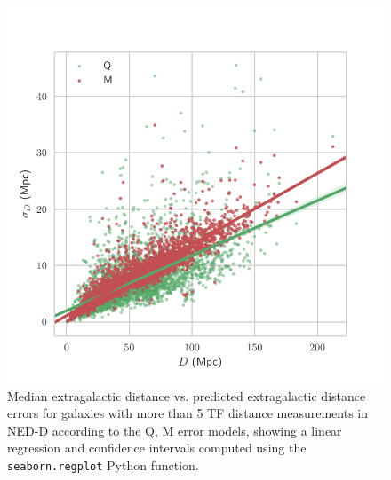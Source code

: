 \documentclass[a4paper,fleqn,usenatbib]{mnras}
\begin{document}
\begin{figure}

	\includegraphics[scale=0.7]{qm}
    \caption{Median extragalactic distance vs. predicted extragalactic distance errors for galaxies with more than 5 TF distance measurements in NED-D according to the Q, M error models, showing a linear regression and confidence intervals computed using the \texttt{seaborn.regplot} Python function.}
    \label{fig:qm}
\end{figure}
\end{document}
